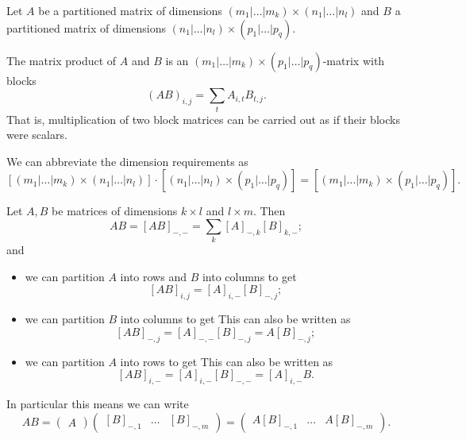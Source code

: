 \begin{proposition}
Let $A$ be a partitioned matrix of dimensions $(m_1|\ldots|m_k) \times (n_1|\ldots|n_l)$ and $B$ a partitioned matrix of dimensions $(n_1|\ldots|n_l)\times (p_1|\ldots|p_q)$.

The matrix product of $A$ and $B$ is an $(m_1|\ldots|m_k) \times (p_1|\ldots|p_q)$-matrix with blocks
\[ (AB)_{i,j} = \sum_{t}A_{i,t}B_{t,j}. \]
That is, multiplication of two block matrices can be carried out as if their blocks were scalars.
\end{proposition}
We can abbreviate the dimension requirements as
\[ [(m_1|\ldots|m_k) \times (n_1|\ldots|n_l)]\cdot[(n_1|\ldots|n_l)\times (p_1|\ldots|p_q)] = [(m_1|\ldots|m_k) \times (p_1|\ldots|p_q)]. \]
\begin{corollary} \label{multiplicationBlockMatrices}
Let $A,B$ be matrices of dimensions $k\times l$ and $l \times m$. Then
\[ AB = [AB]_{-,-} = \sum_k[A]_{-,k}[B]_{k, -}; \]
and
\begin{itemize}
\item we can partition $A$ into rows and $B$ into columns to get
\[ [AB]_{i,j} = [A]_{i,-}[B]_{-, j}; \]
\item we can partition $B$ into columns to get
This can also be written as
\[ [AB]_{-, j} = [A]_{-,-}[B]_{-,j} = A[B]_{-, j}; \]
\item we can partition $A$ into rows to get
This can also be written as
\[ [AB]_{i, -} = [A]_{i,-}[B]_{-,-} = [A]_{i,-}B. \]
\end{itemize}
\end{corollary}
In particular this means we can write
\[ AB = \begin{pmatrix}
A
\end{pmatrix} \begin{pmatrix}
[B]_{-,1} & \hdots & [B]_{-, m}
\end{pmatrix} = \begin{pmatrix}
A[B]_{-,1} & \hdots & A[B]_{-,m}
\end{pmatrix}. \]


